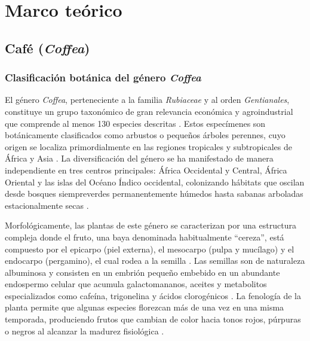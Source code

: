 \section{Marco teórico}

\subsection{Café (\textit{Coffea})}

\subsubsection{Clasificación botánica del género \textit{Coffea}}

El género \textit{Coffea}, perteneciente a la familia \textit{Rubiaceae} y al orden \textit{Gentianales}, constituye un grupo taxonómico de gran relevancia económica y agroindustrial que comprende al menos 130 especies descritas \parencite{baschenis_comparative_2026, garcia_agro-morphological_2025, park_comparative_2025}. Estos especímenes son botánicamente clasificados como arbustos o pequeños árboles perennes, cuyo origen se localiza primordialmente en las regiones tropicales y subtropicales de África y Asia \parencite{gomez-godinez_exploring_2024, himri_comparative_2025, lorencone_agricultural_2023}. La diversificación del género se ha manifestado de manera independiente en tres centros principales: África Occidental y Central, África Oriental y las islas del Océano Índico occidental, colonizando hábitats que oscilan desde bosques siempreverdes permanentemente húmedos hasta sabanas arboladas estacionalmente secas \parencite{baschenis_comparative_2026}.

Morfológicamente, las plantas de este género se caracterizan por una estructura compleja donde el fruto, una baya denominada habitualmente ``cereza'', está compuesto por el epicarpo (piel externa), el mesocarpo (pulpa y mucílago) y el endocarpo (pergamino), el cual rodea a la semilla \parencite{ferreira_impact_2024, hasan_comparative_2024, osorio_hernandez_bioclimatic_2018}. Las semillas son de naturaleza albuminosa y consisten en un embrión pequeño embebido en un abundante endospermo celular que acumula galactomananos, aceites y metabolitos especializados como cafeína, trigonelina y ácidos clorogénicos \parencite{baschenis_comparative_2026}. La fenología de la planta permite que algunas especies florezcan más de una vez en una misma temporada, produciendo frutos que cambian de color hacia tonos rojos, púrpuras o negros al alcanzar la madurez fisiológica \parencite{osorio_hernandez_bioclimatic_2018, barbosa_sensory_2019, baschenis_comparative_2026}.

